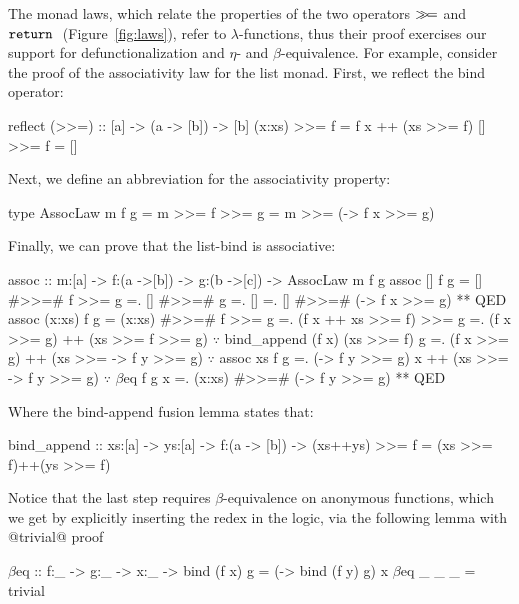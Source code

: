 

%
The monad laws, which relate the
properties of the two operators
$\gg\!=$ and $\texttt{return}\ $ (Figure~\ref{fig:laws}),
refer to $\lambda$-functions,
thus their proof exercises
our support for defunctionalization
and $\eta$- and $\beta$-equivalence.
%
For example, consider the proof of the
associativity law for the list monad.
First, we reflect the bind operator:
%
\begin{code}
  reflect (>>=) :: [a] -> (a -> [b]) -> [b]
  (x:xs) >>= f = f x ++ (xs >>= f)
  []     >>= f = []
\end{code}
%
Next, we define an abbreviation for the associativity property:
%
\begin{code}
type AssocLaw m f g =
  {m >>= f >>= g = m >>= (\x -> f x >>= g)}
\end{code}
%
Finally, we can prove that the list-bind is associative:
%
\begin{mcode}
assoc :: m:[a] -> f:(a ->[b]) -> g:(b ->[c])
      -> AssocLaw m f g
assoc [] f g
  =  [] #>>=# f >>= g
  =. [] #>>=# g
  =. []
  =. [] #>>=# (\x -> f x >>= g) ** QED
assoc (x:xs) f g
  =  (x:xs) #>>=# f  >>= g
  =. (f x ++ xs >>= f) >>= g
  =. (f x >>= g) ++ (xs >>= f >>= g)
     $\because$ bind_append (f x) (xs >>= f) g
  =. (f x >>= g) ++ (xs >>= \y -> f y >>= g)
     $\because$ assoc xs f g
  =. (\y -> f y >>= g) x ++
     (xs >>= \y -> f y >>= g)
     $\because$ $\beta$eq f g x
  =. (x:xs) #>>=# (\y -> f y >>= g) ** QED
\end{mcode}
%
Where the bind-append fusion lemma states that:
%
\begin{code}
bind_append ::
  xs:[a] -> ys:[a] -> f:(a -> [b]) ->
  {(xs++ys) >>= f = (xs >>= f)++(ys >>= f)}
\end{code}
%
Notice that the last step requires
$\beta$-equivalence on anonymous
functions, which we get by explicitly
inserting the redex in the logic,
via the following lemma with @trivial@ proof
%
\begin{mcode}
  $\beta$eq :: f:_ -> g:_ -> x:_ ->
     {bind (f x) g = (\y -> bind (f y) g) x}
  $\beta$eq _ _ _ = trivial
\end{mcode}
%


